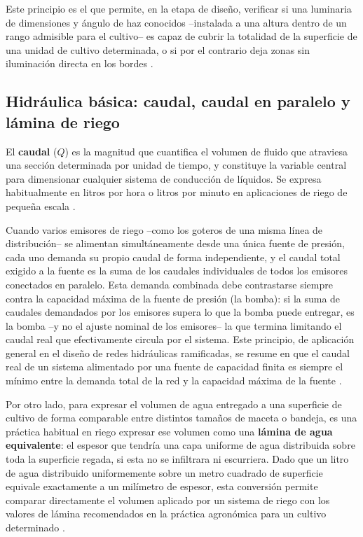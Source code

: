 Este principio es el que permite, en la etapa de diseño, verificar si una luminaria de dimensiones y ángulo de haz conocidos --instalada a una altura dentro de un rango admisible para el cultivo-- es capaz de cubrir la totalidad de la superficie de una unidad de cultivo determinada, o si por el contrario deja zonas sin iluminación directa en los bordes \cite{dilaura2011ies}.

\subsection{Hidráulica básica: caudal, caudal en paralelo y lámina de riego}
\label{subsec:hidraulica_riego}

El \textbf{caudal} ($Q$) es la magnitud que cuantifica el volumen de fluido que atraviesa una sección determinada por unidad de tiempo, y constituye la variable central para dimensionar cualquier sistema de conducción de líquidos. Se expresa habitualmente en litros por hora o litros por minuto en aplicaciones de riego de pequeña escala \cite{mott2015mecanica}.

Cuando varios emisores de riego --como los goteros de una misma línea de distribución-- se alimentan simultáneamente desde una única fuente de presión, cada uno demanda su propio caudal de forma independiente, y el caudal total exigido a la fuente es la suma de los caudales individuales de todos los emisores conectados en paralelo. Esta demanda combinada debe contrastarse siempre contra la capacidad máxima de la fuente de presión (la bomba): si la suma de caudales demandados por los emisores supera lo que la bomba puede entregar, es la bomba --y no el ajuste nominal de los emisores-- la que termina limitando el caudal real que efectivamente circula por el sistema. Este principio, de aplicación general en el diseño de redes hidráulicas ramificadas, se resume en que el caudal real de un sistema alimentado por una fuente de capacidad finita es siempre el mínimo entre la demanda total de la red y la capacidad máxima de la fuente \cite{cengel2018mecanica}.

Por otro lado, para expresar el volumen de agua entregado a una superficie de cultivo de forma comparable entre distintos tamaños de maceta o bandeja, es una práctica habitual en riego expresar ese volumen como una \textbf{lámina de agua equivalente}: el espesor que tendría una capa uniforme de agua distribuida sobre toda la superficie regada, si esta no se infiltrara ni escurriera. Dado que un litro de agua distribuido uniformemente sobre un metro cuadrado de superficie equivale exactamente a un milímetro de espesor, esta conversión permite comparar directamente el volumen aplicado por un sistema de riego con los valores de lámina recomendados en la práctica agronómica para un cultivo determinado \cite{allen1998fao56}.

